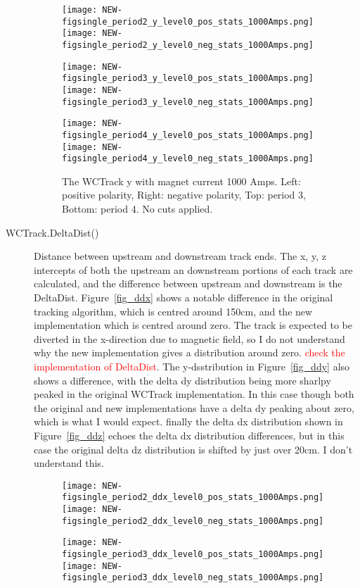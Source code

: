 \begin{description}
{      \begin{figure}[h]
         	\texttt{[image: NEW-figsingle\_period2\_y\_level0\_pos\_stats\_1000Amps.png]}
	 \texttt{[image: NEW-figsingle\_period2\_y\_level0\_neg\_stats\_1000Amps.png]}
	 
   	\texttt{[image: NEW-figsingle\_period3\_y\_level0\_pos\_stats\_1000Amps.png]}
	 \texttt{[image: NEW-figsingle\_period3\_y\_level0\_neg\_stats\_1000Amps.png]}
	 
 	\texttt{[image: NEW-figsingle\_period4\_y\_level0\_pos\_stats\_1000Amps.png]}
	 \texttt{[image: NEW-figsingle\_period4\_y\_level0\_neg\_stats\_1000Amps.png]}
   \caption[short]{The WCTrack y with magnet current 1000 Amps. Left: positive polarity, Right: negative polarity, Top: period 3, Bottom: period 4. No cuts applied.}
   \label{fig_y}
  \end{figure}
  
  
 }


\item[WCTrack.DeltaDist()]{
Distance between upstream and downstream track ends. The x, y, z intercepts of both the upstream an downstream portions of each track are calculated, and the difference between upstream and downstream is the DeltaDist. Figure~\ref{fig_ddx}  shows a notable difference in the original tracking algorithm, which is centred around 150cm,  and the new implementation which is centred around zero. The track is expected to be diverted in the x-direction due to magnetic field, so I do not understand why the new implementation gives a distribution around zero. \textcolor{red}{check the implementation of DeltaDist}. The y-dsstribution in Figure~\ref{fig_ddy} also shows a difference, with the delta dy distribution being more sharlpy peaked in the original WCTrack implementation.  In this case though both the original and new implementations have a delta dy peaking about zero, which is what I would expect. finally the delta dx distribution shown in Figure~\ref{fig_ddz} echoes the delta dx distribution differences, but in this case the original delta dz distribution is shifted by just over 20cm. I don't understand this. 

 \begin{figure}[h]	 
    	\texttt{[image: NEW-figsingle\_period2\_ddx\_level0\_pos\_stats\_1000Amps.png]}
	 \texttt{[image: NEW-figsingle\_period2\_ddx\_level0\_neg\_stats\_1000Amps.png]}
	 
   	\texttt{[image: NEW-figsingle\_period3\_ddx\_level0\_pos\_stats\_1000Amps.png]}
	 \texttt{[image: NEW-figsingle\_period3\_ddx\_level0\_neg\_stats\_1000Amps.png]}
	 

\end{figure}}
\end{description}
